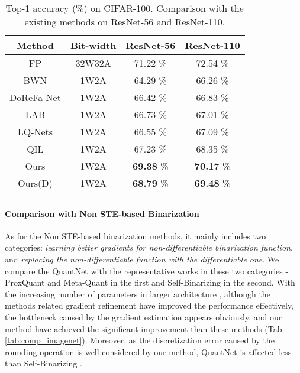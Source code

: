 \documentclass[runningheads]{llncs}
\begin{document}
\begin{table}[htb]
\begin{center}
\begin{tabular}{cccc}
    \hline
    Method & Bit-width & ResNet-56 & ResNet-110    \\
    \hline
    FP                                      &32W32A & 71.22 \% & 72.54 \%   \\
    BWN \cite{courbariaux2015binaryconnect} &1W2A   & 64.29 \% & 66.26 \%   \\
    DoReFa-Net \cite{Zhou2016DoReFa}        &1W2A   & 66.42 \% & 66.83 \%   \\
    LAB \cite{hou2016loss}                  &1W2A   & 66.73 \% & 67.01 \%   \\
    LQ-Nets \cite{Zhang2018LQ}              &1W2A   & 66.55 \% & 67.09 \%   \\
    QIL \cite{jung2019learning}             &1W2A   & 67.23 \% & 68.35 \%   \\
    Ours                                    &1W2A   & \textbf{69.38} \% & \textbf{70.17} \%  \\
    Ours(D)                                 &1W2A   & \textbf{68.79} \% & \textbf{69.48} \%  \\
    \hline
    \noalign{\smallskip}
    \end{tabular}
    \caption{Top-1 accuracy (\%) on CIFAR-100. Comparison with the existing methods on ResNet-56 and ResNet-110.}
    \label{tab:comp_cifar}
\end{center}
\end{table}


\paragraph{\textbf{Comparison with Non STE-based Binarization}}
As for the Non STE-based binarization methods,
it mainly includes two categories: \emph{learning better gradients for non-differentiable binarization function},
and \emph{replacing the non-differentiable function with the differentiable one}.
We compare the QuantNet with the representative works in these two categories -
ProxQuant \cite{bai2019prox} and Meta-Quant \cite{chen2019meta} in the first
and Self-Binarizing \cite{lahoud2019self} in the second.
With the increasing number of parameters in larger architecture \cite{he2016deep},
although the methods \cite{bai2019prox,chen2019meta}
related gradient refinement have improved the performance effectively,
the bottleneck caused by the gradient estimation appears obviously,
and our method have achieved the significant improvement than these methods (Tab. \ref{tab:comp_imagenet}).
Moreover, as the discretization error caused by the rounding operation is well considered by our method,
QuantNet is affected less than Self-Binarizing \cite{lahoud2019self}.
\end{document}
